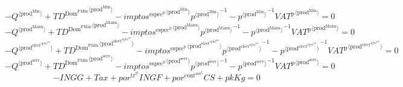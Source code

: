 \begin{equation}
-{Q}^{\langle \mathrm{prod}^{\mathrm{Min}}\rangle} + {{T\!D}^{\mathrm{Dom}^{\mathrm{PMin}}}}^{\langle \mathrm{prod}^{\mathrm{Min}}\rangle} - {{{i\!m\!p\!t\!o\!s}^{\mathrm{espec}^{\mathrm{p}}}}^{\langle \mathrm{\mathrm{prod}^{\mathrm{Min}}}\rangle}} {{p}^{\langle \mathrm{prod}^{\mathrm{Min}}\rangle}}^{-1} - {{p}^{\langle \mathrm{prod}^{\mathrm{Min}}\rangle}}^{-1} {{{V\!A\!T}^{\mathrm{p}}}^{\langle \mathrm{prod}^{\mathrm{Min}}\rangle}} = 0
\end{equation}
\begin{equation}
-{Q}^{\langle \mathrm{prod}^{\mathrm{Manu}}\rangle} + {{T\!D}^{\mathrm{Dom}^{\mathrm{PMin}}}}^{\langle \mathrm{prod}^{\mathrm{Manu}}\rangle} - {{{i\!m\!p\!t\!o\!s}^{\mathrm{espec}^{\mathrm{p}}}}^{\langle \mathrm{\mathrm{prod}^{\mathrm{Manu}}}\rangle}} {{p}^{\langle \mathrm{prod}^{\mathrm{Manu}}\rangle}}^{-1} - {{p}^{\langle \mathrm{prod}^{\mathrm{Manu}}\rangle}}^{-1} {{{V\!A\!T}^{\mathrm{p}}}^{\langle \mathrm{prod}^{\mathrm{Manu}}\rangle}} = 0
\end{equation}
\begin{equation}
-{Q}^{\langle \mathrm{prod}^{\mathrm{elect}^{\mathrm{agua}^{\mathrm{gas}}}}\rangle} + {{T\!D}^{\mathrm{Dom}^{\mathrm{PMin}}}}^{\langle \mathrm{prod}^{\mathrm{elect}^{\mathrm{agua}^{\mathrm{gas}}}}\rangle} - {{{i\!m\!p\!t\!o\!s}^{\mathrm{espec}^{\mathrm{p}}}}^{\langle \mathrm{\mathrm{prod}^{\mathrm{elect}^{\mathrm{agua}^{\mathrm{gas}}}}}\rangle}} {{p}^{\langle \mathrm{prod}^{\mathrm{elect}^{\mathrm{agua}^{\mathrm{gas}}}}\rangle}}^{-1} - {{p}^{\langle \mathrm{prod}^{\mathrm{elect}^{\mathrm{agua}^{\mathrm{gas}}}}\rangle}}^{-1} {{{V\!A\!T}^{\mathrm{p}}}^{\langle \mathrm{prod}^{\mathrm{elect}^{\mathrm{agua}^{\mathrm{gas}}}}\rangle}} = 0
\end{equation}
\begin{equation}
-{Q}^{\langle \mathrm{prod}^{\mathrm{serv}}\rangle} + {{T\!D}^{\mathrm{Dom}^{\mathrm{PMin}}}}^{\langle \mathrm{prod}^{\mathrm{serv}}\rangle} - {{{i\!m\!p\!t\!o\!s}^{\mathrm{espec}^{\mathrm{p}}}}^{\langle \mathrm{\mathrm{prod}^{\mathrm{serv}}}\rangle}} {{p}^{\langle \mathrm{prod}^{\mathrm{serv}}\rangle}}^{-1} - {{p}^{\langle \mathrm{prod}^{\mathrm{serv}}\rangle}}^{-1} {{{V\!A\!T}^{\mathrm{p}}}^{\langle \mathrm{prod}^{\mathrm{serv}}\rangle}} = 0
\end{equation}
\begin{equation}
-{I\!N\!G\!G} + {T\!a\!x} + {{p\!o\!r}^{\mathrm{tr}^{\mathrm{f}^{\mathrm{g}}}}} {{I\!N\!G\!F}} + {{p\!o\!r}^{\mathrm{cont}^{\mathrm{soc}^{\mathrm{g}}}}} {{C\!S}} + {{p\!k}} {{K\!g}} = 0
\end{equation}
